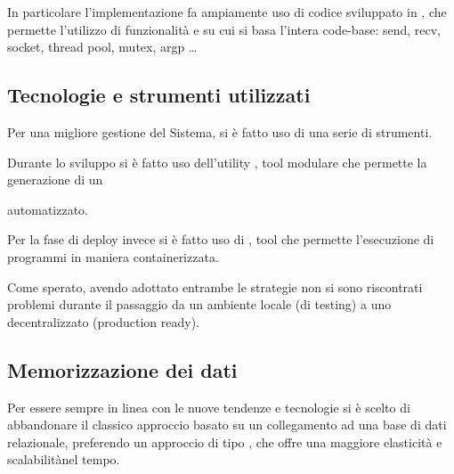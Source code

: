         In particolare l'implementazione fa ampiamente uso di codice sviluppato in , che permette l'utilizzo di funzionalità
        e \footnotemark su cui si basa l'intera code-base: send, recv, socket, thread pool, mutex, argp \dots

    \subsection{Tecnologie e strumenti utilizzati}
      Per una migliore gestione del Sistema, si è fatto uso di una serie di strumenti.

      Durante lo sviluppo si è fatto uso dell'utility \footnotemark {} , tool modulare che permette la generazione di un \footnotemark

      automatizzato.


      Per la fase di deploy invece si è fatto uso di , tool che permette l'esecuzione di programmi in maniera containerizzata.

      Come sperato, avendo adottato entrambe le strategie non si sono riscontrati problemi durante il passaggio da un ambiente locale (di testing) a uno decentralizzato (production ready).
    \subsection{Memorizzazione dei dati}
    Per essere sempre in linea con le nuove tendenze e tecnologie si è scelto di abbandonare il classico approccio basato su un collegamento ad una base di dati relazionale, preferendo un approccio di tipo \footnotemark ,  che offre una maggiore elasticità \footnotemark {}
    e scalabilità\footnotemark nel tempo.

    \newpage
